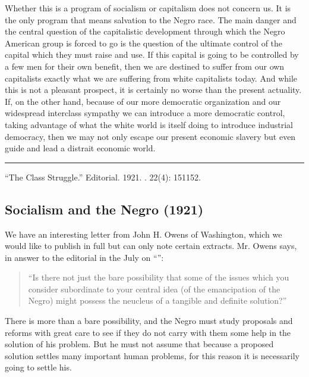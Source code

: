\documentclass[letterpaper,10pt,english]{jupyterBook}
\begin{document}
\sphinxAtStartPar
Whether this is a program of socialism or capitalism does not concern us. It is the only program that means salvation to the Negro race. The main danger and the central question of the capitalistic development through which the Negro American group is forced to go is the question of the ultimate control of the capital which they must raise and use. If this capital is going to be controlled by a few men for their own benefit, then we are destined to suffer from our own capitalists exactly what we are suffering from white capitalists today. And while this is not a pleasant prospect, it is certainly no worse than the present actuality. If, on the other hand, because of our more democratic organization and our widespread inter\sphinxhyphen{}class sympathy we can introduce a more democratic control, taking advantage of what the white world is itself doing to introduce industrial democracy, then we may not only escape our present economic slavery but even guide and lead a distrait economic world.


\bigskip\hrule\bigskip


\sphinxAtStartPar
{} “The Class Struggle.” Editorial. 1921. . 22(4): 151\sphinxhyphen{}152.


\subsection{Socialism and the Negro (1921)}
\label{\detokenize{Volumes/22/06/socialism_and_the_negro:socialism-and-the-negro-1921}}\label{\detokenize{Volumes/22/06/socialism_and_the_negro::doc}}
\sphinxAtStartPar
We have an interesting letter from John H. Owens of Washington, which we would like to publish in full but can only note certain extracts. Mr. Owens says, in answer to the editorial in the July  on “{\hyperref[\detokenize{Volumes/22/03/negro_and_radical_thought::doc}]{}}”:
\begin{quote}

\sphinxAtStartPar
“Is there not just the bare possibility that some of the issues which you consider subordinate to your central idea (of the emancipation of the Negro) might possess the neucleus of a tangible and definite solution?”
\end{quote}

\sphinxAtStartPar
There is more than a bare possibility, and the Negro must study proposals and reforms with great care to see if they do not carry with them some help in the solution of his problem. But he must not assume that because a proposed solution settles many important human problems, for this reason it is necessarily going to settle his.
\end{document}
